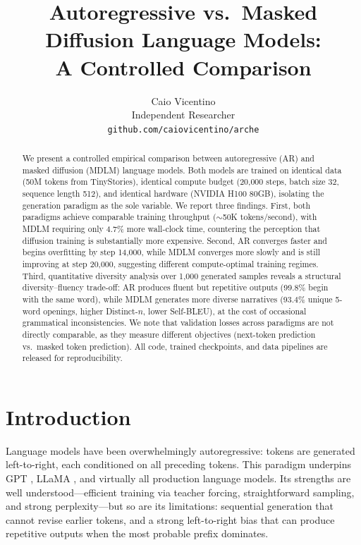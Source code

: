\documentclass[11pt,a4paper]{article}
\title{%
  Autoregressive vs.\ Masked Diffusion Language Models:\\
  A Controlled Comparison%
}
\author{
  Caio Vicentino \\
  Independent Researcher \\
  \texttt{github.com/caiovicentino/arche}
}
\date{}
\begin{document}
\maketitle

\begin{abstract}
We present a controlled empirical comparison between autoregressive (AR) and masked diffusion (MDLM) language models.
Both models are trained on identical data (50M tokens from TinyStories), identical compute budget (20{,}000 steps, batch size 32, sequence length 512), and identical hardware (NVIDIA H100 80GB), isolating the generation paradigm as the sole variable.
We report three findings.
First, both paradigms achieve comparable training throughput (${\sim}$50K tokens/second), with MDLM requiring only 4.7\% more wall-clock time, countering the perception that diffusion training is substantially more expensive.
Second, AR converges faster and begins overfitting by step 14{,}000, while MDLM converges more slowly and is still improving at step 20{,}000, suggesting different compute-optimal training regimes.
Third, quantitative diversity analysis over 1{,}000 generated samples reveals a structural diversity--fluency trade-off: AR produces fluent but repetitive outputs (99.8\% begin with the same word), while MDLM generates more diverse narratives (93.4\% unique 5-word openings, higher Distinct-$n$, lower Self-BLEU), at the cost of occasional grammatical inconsistencies.
We note that validation losses across paradigms are not directly comparable, as they measure different objectives (next-token prediction vs.\ masked token prediction).
All code, trained checkpoints, and data pipelines are released for reproducibility.
\end{abstract}

\section{Introduction}

Language models have been overwhelmingly autoregressive: tokens are generated left-to-right, each conditioned on all preceding tokens.
This paradigm underpins GPT \citep{radford2019gpt2}, LLaMA \citep{touvron2023llama}, and virtually all production language models.
Its strengths are well understood---efficient training via teacher forcing, straightforward sampling, and strong perplexity---but so are its limitations: sequential generation that cannot revise earlier tokens, and a strong left-to-right bias that can produce repetitive outputs when the most probable prefix dominates.
\end{document}
